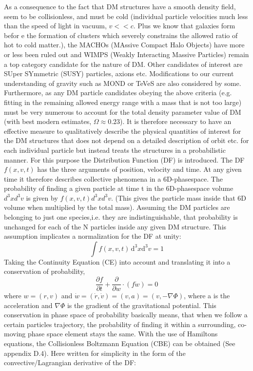 As a consequence to the fact that DM structures have a smooth density field, seem to be collisionless, and must be cold (individual particle velocities much less than the speed of light in vacuum, $v << c $. Plus we know that galaxies form befor e the formation of clusters which severely constrains the allowed ratio of hot to cold matter.), the MACHOs (MAssive Compact Halo Objects) have more or less been ruled out and WIMPS (Weakly Interacting Massive Particles) remain a top category candidate for the nature of DM. Other candidates of interest are SUper SYmmetric (SUSY) particles, axions etc. Modifications to our current understanding of gravity such as MOND or TeVeS are also considered by some. Furthermore, as any DM particle candidates obeying the above criteria (e.g. fitting in the remaining allowed energy range with a mass that is not too large) must be very numerous to account for the total density parameter value of DM (with best modern estimates, $\Omega \approx 0.23$). It is therefore necessary to have an effective measure to qualitatively describe the physical quantities of interest for the DM structures that does not depend on a detailed description of orbit etc. for each individual particle but instead treats the structures in a probabilistic manner. For this purpose the Distribution Function (DF) is introduced. The DF $f(x,v,t)$ has the three arguments of position, velocity and time. At any given time it therefore describes collective phenomena in a 6D-phasespace. The probability of finding a given particle at time t in the 6D-phasespace volume $d^3xd^3v$ is given by $f(x,v,t)d^3xd^3v$. (This gives the particle mass inside that 6D volume when multiplied by the total mass). Assuming the DM particles are belonging to just one species,i.e. they are indistinguishable, that probability is unchanged for each of the N particles inside any given DM structure. This assumption implicates a normalization for the DF at unity:
\begin{equation}
\int \! f(x,v,t) \, \mathrm{d^3}x \mathrm{d^3}v = 1
\end{equation}
Taking the Continuity Equation (CE) into account and translating it into a conservation of probability,
\begin{equation}
\frac{\partial f}{\partial t} + \frac{\partial}{\partial w}\cdot (f\dot{w}) = 0
\end{equation}
where $w = (r,v)$ and $ \dot{w} = (\dot{r},\dot{v}) = (v, a ) = (v, -\nabla \Phi ) $, where a is the acceleration and $\nabla \Phi$ is the gradient of the gravitational potential. This conservation in phase space of probability basically means, that when we follow a certain particles trajectory, the probability of finding it within a surrounding, co-moving phase space element stays the same. With the use of Hamiltons equations, the Collisionless Boltzmann Equation (CBE) can be obtained (See appendix D.4). Here written for simplicity in the form of the convective/Lagrangian derivative of the DF: \\

